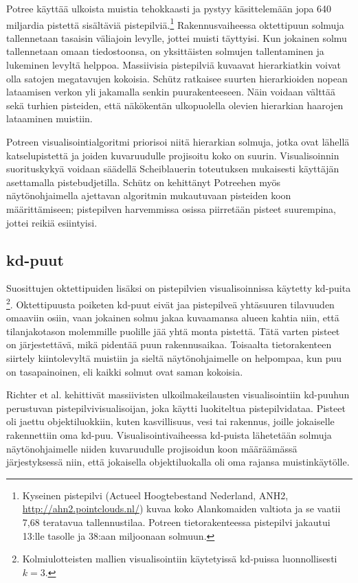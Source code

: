 Potree käyttää ulkoista muistia tehokkaasti ja pystyy käsittelemään jopa 640 miljardia pistettä sisältäviä pistepilviä.\footnote{Kyseinen pistepilvi (Actueel Hoogtebestand Nederland, ANH2, \url{http://ahn2.pointclouds.nl/}) kuvaa koko Alankomaiden valtiota ja se vaatii 7,68 teratavua tallennustilaa. Potreen tietorakenteessa pistepilvi jakautui 13:lle tasolle ja 38:aan miljoonaan solmuun.} Rakennusvaiheessa oktettipuun solmuja tallennetaan tasaisin väliajoin levylle, jottei muisti täyttyisi. Kun jokainen solmu tallennetaan omaan tiedostoonsa, on yksittäisten solmujen tallentaminen ja lukeminen levyltä helppoa. Massiivisia pistepilviä kuvaavat hierarkiatkin voivat olla satojen megatavujen kokoisia. Schütz ratkaisee suurten hierarkioiden nopean lataamisen verkon yli jakamalla senkin puurakenteeseen. Näin voidaan välttää sekä turhien pisteiden, että näkökentän ulkopuolella olevien hierarkian haarojen lataaminen muistiin. \cite{potree}

Potreen visualisointialgoritmi priorisoi niitä hierarkian solmuja, jotka ovat lähellä katselupistettä ja joiden kuvaruudulle projisoitu koko on suurin. Visualisoinnin suorituskykyä voidaan säädellä Scheiblauerin toteutuksen mukaisesti käyttäjän asettamalla pistebudjetilla. Schütz on kehittänyt Potreehen myös näytönohjaimella ajettavan algoritmin mukautuvaan pisteiden koon määrittämiseen; pistepilven harvemmissa osissa piirretään pisteet suurempina, jottei reikiä esiintyisi. \cite{potree}

\subsection{kd-puut}
Suosittujen oktettipuiden lisäksi on pistepilvien visualisoinnissa käytetty kd-puita \footnote{Kolmiulotteisten mallien visualisointiin käytetyissä kd-puissa luonnollisesti $k=3$.}. Oktettipuusta poiketen kd-puut eivät jaa pistepilveä yhtäsuuren tilavuuden omaaviin osiin, vaan jokainen solmu jakaa kuvaamansa alueen kahtia niin, että tilanjakotason molemmille puolille jää yhtä monta pistettä. Tätä varten pisteet on järjestettävä, mikä pidentää puun rakennusaikaa. Toisaalta tietorakenteen siirtely kiintolevyltä muistiin ja sieltä näytönohjaimelle on helpompaa, kun puu on tasapainoinen, eli kaikki solmut ovat saman kokoisia. \cite{richter}

Richter et al. kehittivät massiivisten ulkoilmakeilausten visualisointiin kd-puuhun perustuvan pistepilvivisualisoijan, joka käytti luokiteltua pistepilvidataa. Pisteet oli jaettu objektiluokkiin, kuten kasvillisuus, vesi tai rakennus, joille jokaiselle rakennettiin oma kd-puu. Visualisointivaiheessa kd-puista lähetetään solmuja näytönohjaimelle niiden kuvaruudulle projisoidun koon määräämässä järjestyksessä niin, että jokaisella objektiluokalla oli oma rajansa muistinkäytölle. \cite{richter}

